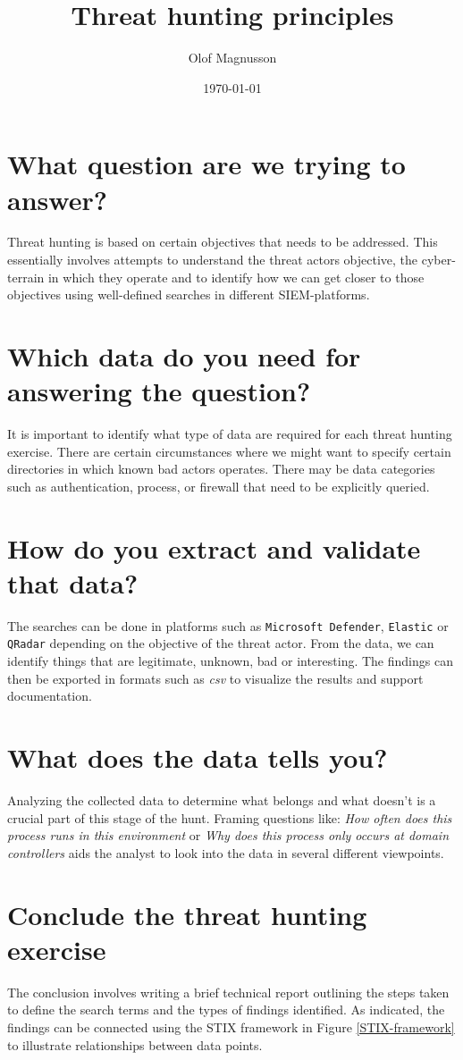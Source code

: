 \documentclass{article}
\title{Threat hunting principles \\
}
\author{Olof Magnusson}
\date{\today}
\begin{document}
	
	\maketitle
	
	\section*{What question are we trying to answer?}
Threat hunting is based on certain objectives that needs to be addressed. This essentially involves attempts to understand the threat actors objective, the cyber-terrain in which they operate and to identify how we can get closer to those objectives using well-defined searches in different SIEM-platforms. 



	\section*{Which data do you need for answering the question?}
	It is important to identify what type of data are required for each threat hunting exercise. There are certain circumstances where we might want to specify certain directories in which known bad actors operates. There may be data categories such as authentication, process, or firewall that need to be explicitly queried.
    
	\section*{How do you extract and validate that data?}
	The searches can be done in platforms such as \texttt{Microsoft Defender}, \texttt{Elastic} or \texttt{QRadar} depending on the objective of the threat actor. From the data, we can identify things that are legitimate, unknown, bad or interesting. The findings can then be exported in formats such as \textit{csv} to visualize the results and support documentation.
	\section*{What does the data tells you?}
	Analyzing the collected data to determine what belongs and what doesn't is a crucial part of this stage of the hunt. Framing questions like: \textit{How often does this process runs in this environment} or \textit{Why does this process only occurs at domain controllers} aids the analyst to look into the data in several different viewpoints.
	
	\section*{Conclude the threat hunting exercise}
	The conclusion involves writing a brief technical report outlining the steps taken to define the search terms and the types of findings identified. As indicated, the findings can be connected using the STIX framework in Figure \ref{STIX-framework} to illustrate relationships between data points.
		
\end{document}
